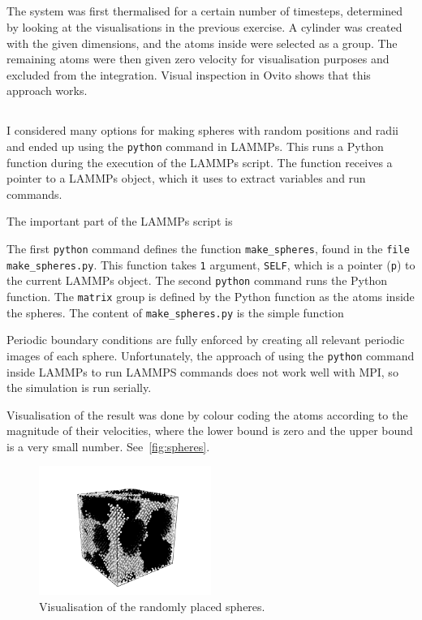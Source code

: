 \documentclass[11pt,british,a4paper]{report}
\begin{document}
\subsection{}
The system was first thermalised for a certain number of timesteps, determined by looking at the visualisations in the previous exercise. A cylinder was created with the given dimensions, and the atoms inside were selected as a group. The remaining atoms were then given zero velocity for visualisation purposes and excluded from the integration. Visual inspection in Ovito shows that this approach works.

\subsection{}
I considered many options for making spheres with random positions and radii and ended up using the \lstinline{python} command in LAMMPs. This runs a Python function during the execution of the LAMMPs script. The function receives a pointer to a LAMMPs object, which it uses to extract variables and run commands.

The important part of the LAMMPs script is

The first \lstinline{python} command defines the function \lstinline{make_spheres}, found in the \lstinline{file make_spheres.py}. This function takes \lstinline{1} argument, \lstinline{SELF}, which is a pointer (\lstinline{p}) to the current LAMMPs object. The second \lstinline{python} command runs the Python function. The \lstinline{matrix} group is defined by the Python function as the atoms inside the spheres. The content of \lstinline{make_spheres.py} is the simple function

Periodic boundary conditions are fully enforced by creating all relevant periodic images of each sphere. Unfortunately, the approach of using the \lstinline{python} command inside LAMMPs to run LAMMPS commands does not work well with MPI, so the simulation is run serially.

Visualisation of the result was done by colour coding the atoms according to the magnitude of their velocities, where the lower bound is zero and the upper bound is a very small number. See~\vref{fig:spheres}.
\begin{figure}[H]
    \centering
    \includegraphics[width=0.5\textwidth]{cd/spheres.png}
    \caption{Visualisation of the randomly placed spheres.}%
    \label{fig:spheres}
\end{figure}
\end{document}
